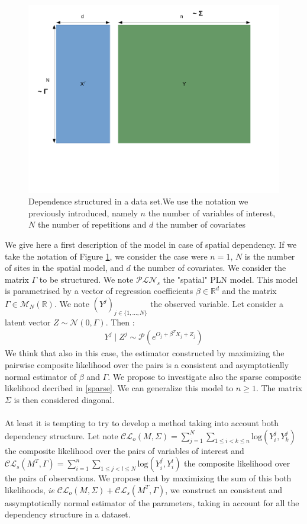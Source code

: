 \documentclass[11pt, a4paper]{article}
\begin{document}
\begin{figure}[!h] \label{fig}
\includegraphics[scale=0.4]{Dependance_2.pdf}
\caption{Dependence structured in a data set.We use the notation we previously introduced, namely $n$ the number of variables of interest, $N$ the number of repetitions and $d$ the number of covariates}
\end{figure}

We give here a first description of the model in case of spatial dependency. If we take the notation of Figure \ref{fig}, we consider the case were $n=1$, $N$ is the number of sites in the spatial model, and $d$ the number of covariates. We consider the matrix  $\Gamma$ to be structured. We note $\mathcal{PLN}_s$ the "spatial" PLN model. This model is parametrised by a vector of regression coefficients $\beta \in \mathbb{R}^d$ and the matrix $\Gamma \in \mathcal{M}_N(\mathbb{R})$. We note $(Y^j)_{j \in \{1,...,N\}}$ the observed variable. Let consider a latent vector $Z \sim \mathcal{N}(0,\Gamma)$. Then :
\begin{align*}
Y^j\mid Z^j \sim \mathcal{P}(e^{O_j+\beta^T X_j + Z_j})
\end{align*}
We think that also in this case, the estimator constructed by maximizing the pairwise composite likelihood over the pairs is a consistent and asymptotically normal estimator of $\beta$ and $\Gamma$. We propose to investigate also the sparse composite likelihood decribed in \ref{sparse}. We can generalize this model to $n \geq 1$. The matrix $\Sigma$ is then considered diagonal.\\
\\
At least it is tempting to try to develop a method taking into account both dependency structure. Let note $\mathcal{CL}_o{(M,\Sigma)}=\sum_{j=1}^N \sum_{1 \leq i<k \leq n} \mathrm{log}(Y^j_i, Y^j_k)$ the composite likelihood over the pairs of variables of interest and $\mathcal{CL}_s(M^T,\Gamma) = \sum_{i=1}^n \sum_{1 \leq j<l \leq N} \mathrm{log}(Y^j_i, Y^l_i)$ the composite likelihood over the pairs of observations. We propose that by maximizing the sum of this both likelihoods, \textit{ie} $\mathcal{CL}_o (M, \Sigma) + \mathcal{CL}_s (M^T, \Gamma)$, we construct an consistent and assymptotically normal estimator of the parameters, taking in account for all the dependency structure in a dataset.
\newpage  
\appendix
\end{document}
